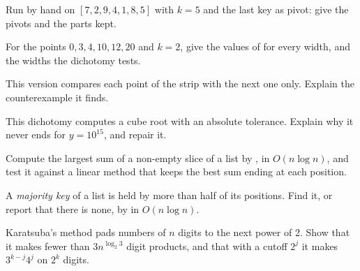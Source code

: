 \begin{exercise}[$\star$]\label{exo:b1:divide-and-conquer:3}
Run  by hand on $[7, 2, 9, 4, 1, 8, 5]$ with $k = 5$ and the last key as pivot: give the pivots and
the parts kept.
\end{exercise}

\begin{exercise}[$\star$]\label{exo:b1:divide-and-conquer:4}
For the points $0, 3, 4, 10, 12, 20$ and $k = 2$, give the values of  for every width, and the widths the
dichotomy tests.
\end{exercise}

\begin{exercise}[$\star\star$]\label{exo:b1:divide-and-conquer:5}
This version compares each point of the strip with the next one only. Explain the counterexample it finds.
\end{exercise}

\begin{exercise}[$\star\star$]\label{exo:b1:divide-and-conquer:6}
This dichotomy computes a cube root with an absolute tolerance. Explain why it never ends for $y = 10^{15}$, and repair
it.
\end{exercise}

\begin{exercise}[$\star\star$]\label{exo:b1:divide-and-conquer:7}
Compute the largest sum of a non-empty slice of a list by , in $O(n \log n)$, and test it against a
linear method that keeps the best sum ending at each position.
\end{exercise}

\begin{exercise}[$\star\star$]\label{exo:b1:divide-and-conquer:8}
A \emph{majority key} of a list is held by more than half of its positions. Find it, or report that there is none, by
 in $O(n \log n)$.
\end{exercise}

\begin{exercise}[$\star\star$]\label{exo:b1:divide-and-conquer:9}
Karatsuba's method pads numbers of $n$ digits to the next power of 2. Show that it makes fewer than $3 n^{\log_2 3}$
digit products, and that with a cutoff $2^j$ it makes $3^{k-j} 4^j$ on $2^k$ digits.
\end{exercise}

